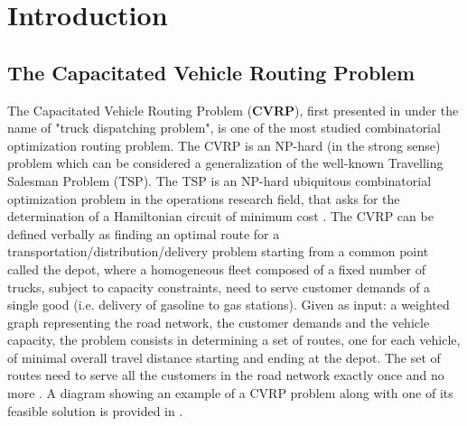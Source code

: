 \chapter{Introduction}
\label{sec:introduction-chapter}

\section{The Capacitated Vehicle Routing Problem}
\label{sec:intro-cvrp-problem}

The Capacitated Vehicle Routing Problem (\textbf{CVRP}), first presented in \textcite{dantzig1959}
under the name of "truck dispatching problem",
is one of the most studied combinatorial optimization routing problem.
The CVRP is an NP-hard (in the strong sense) problem which can be considered a generalization
of the well-known Travelling Salesman Problem (TSP).
The TSP \parencite{flood1956}
is an NP-hard \parencite{garey1976planar} ubiquitous combinatorial optimization problem in the operations research field,
that asks for the determination of a Hamiltonian circuit of minimum cost
\parencite{croes1958, laporte1992,johnson1997,applegate2006,gutin2006,hoffman2013}.
The CVRP can be defined verbally as finding an optimal route for a transportation/distribution/delivery problem
starting from a common point called the depot,
where a homogeneous fleet composed of a fixed number of trucks, subject to capacity constraints,
need to serve customer demands of a single good (i.e. delivery of gasoline to gas stations).
Given as input: a weighted graph representing the road network,
the customer demands and the vehicle capacity,
the problem consists in determining a set of routes, one for each vehicle,
of minimal overall travel distance starting and ending at the depot.
The set of routes need to serve all the customers in the road network exactly once and no more
\parencite{toth2014}.
A diagram showing an example of a CVRP problem along with one of its feasible solution
is provided in .

